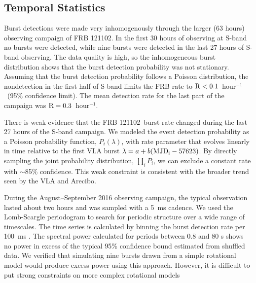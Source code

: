 \documentclass[twocolumn]{aastex61}
\newcommand{\frb}{FRB 121102}
\begin{document}
\subsection{Temporal Statistics}
\label{sec:temp}
Burst detections were made very inhomogenously through the larger (63 hours) observing campaign of FRB 121102. In the first 30 hours of observing at S-band no bursts were detected, while nine bursts were detected in the last 27 hours of S-band observing. The data quality is high, so the inhomogeneous burst distribution shows that the burst detection probability was not stationary. Assuming that the burst detection probability follows a Poisson distribution, the nondetection in the first half of S-band limits the FRB rate to $\rm{R}<0.1$\ hour$^{-1}$\ (95\% confidence limit). The mean detection rate for the last part of the campaign was $\rm{R}=0.3$\ hour$^{-1}$.

There is weak evidence that the \frb\ burst rate changed during the last 27 hours of the S-band campaign. We modeled the event detection probability as a Poisson probability function, $P_i(\lambda)$, with rate parameter that evolves linearly in time relative to the first VLA burst $\lambda = a + b (\rm{MJD}_i - 57623)$. By directly sampling the joint probability distribution, $\prod_{i} P_i$, we can exclude a constant rate with $\sim$85\% confidence. This weak constraint is consistent with the broader trend seen by the VLA and Arecibo.


During the August--September 2016 observing campaign, the typical observation lasted about two hours and was sampled with a 5~ms cadence. We used the Lomb-Scargle periodogram \citep{1982ApJ...263..835S} to search for periodic structure over a wide range of timescales. The time series is calculated by binning the burst detection rate per 100~ms \citep[always either 0 or 1, see also]{2011MNRAS.417.1871P}. 
The spectral power calculated for periods between 0.8 and 80 s shows no power in excess of the typical 95\% confidence bound estimated from shuffled data. We verified that simulating nine bursts drawn from a simple rotational model would produce excess power using this approach. However, it is difficult to put strong constraints on more complex rotational models \citep[e.g., with wide pulse phase windows or glitches][]{2007ApJ...663..497C, 2013Natur.497..591A}
\end{document}
